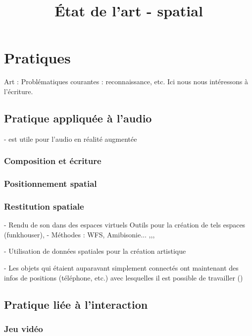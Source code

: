 \documentclass[french,12pt]{article}
\title{État de l'art - spatial}
\begin{document}
\maketitle

\section{Pratiques}
Art : \cite{lodi_spatial_2014}
Problématiques courantes : reconnaissance, etc. Ici nous nous intéressons à l'écriture.
\subsection{Pratique appliquée à l'audio}
- est utile pour l'audio en réalité augmentée\cite{lemordant_augmented_2010}
\subsubsection{Composition et écriture}
\cite{delle_monache_sonic_2011}
\cite{colafrancesco_bibliotheque_2013}
\cite{fober_les_2015}
\subsubsection{Positionnement spatial}
\cite{wozniewski_framework_2006}
\subsubsection{Restitution spatiale}
- Rendu de son dans des espaces virtuels \cite{funkhouser_beam_1998,cheng_design_2014,tsingos_fast_1998,taylor_guided_2012,raghuvanshi_parametric_2014,rodriguez_performance_2014}
Outils pour la création de tels espaces (funkhouser), 
- Méthodes : WFS, Amibisonie... \cite{lim_3d_2015}
\cite{perez-lopez_3dj_2015}
\cite{noisternig_3d_2003}\cite{bates_comparative_2007},\cite{tang_assistive_2014},\cite{sasamoto_controlling_2013},\cite{delerue_spatialisation_2004}

- Utilisation de données spatiales pour la création artistique \cite{naveda_topos_2014}

- Les objets qui étaient auparavant simplement connectés ont maintenant des infos de positions (téléphone, etc.) avec lesquelles il est possible de travailler (\cite{beal_spacetime_2015})
\subsection{Pratique liée à l'interaction}
\subsubsection{Jeu vidéo}
\cite{le_prado_ecriture_2013}
\cite{salazar_modelisation_2004}
\end{document}
